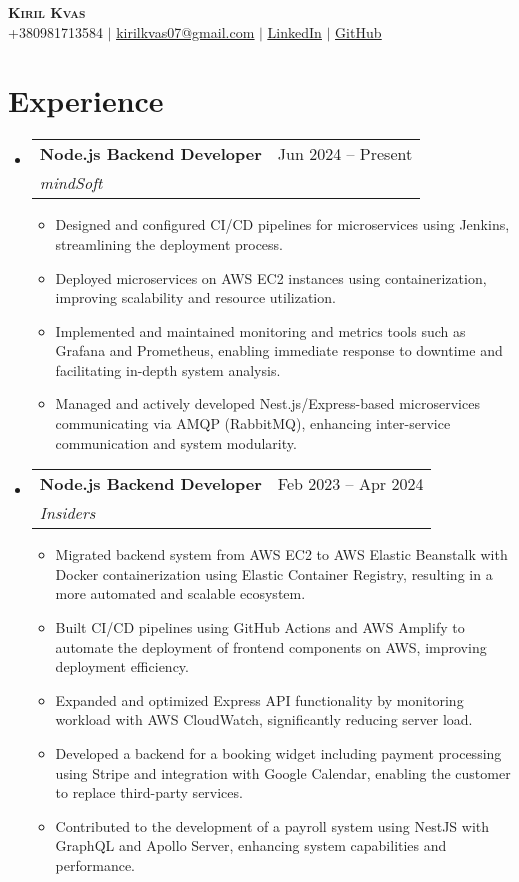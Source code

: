 \documentclass[letterpaper,11pt]{article}
\makeatletter
\newcommand{\resumeItem}[1]{
  \item\small{
    {#1 \vspace{-2pt}}
  }
}
\newcommand{\resumeSubheading}[4]{
  \vspace{-2pt}\item
    \begin{tabular*}{0.97\textwidth}[t]{l@{\extracolsep{\fill}}r}
      \textbf{#1} & #2 \\
      \textit{\small#3} & \textit{\small #4} \\
    \end{tabular*}\vspace{-7pt}
}
\newcommand{\resumeSubHeadingListStart}{\begin{itemize}[leftmargin=0.15in, label={}]}
\newcommand{\resumeSubHeadingListEnd}{\end{itemize}}
\newcommand{\resumeItemListStart}{\begin{itemize}}
\newcommand{\resumeItemListEnd}{\end{itemize}\vspace{-5pt}}
\makeatother
\begin{document}
\begin{center}
    \textbf{\Huge \scshape Kiril Kvas} \\ \vspace{1pt}
    \small +380981713584 $|$ \href{mailto:kirilkvas07@gmail.com}{\underline{kirilkvas07@gmail.com}} $|$ 
    \href{https://www.linkedin.com/in/kiril-kvas-999154239/}{\underline{LinkedIn}} $|$
    \href{https://github.com/rillsvai}{\underline{GitHub}}
\end{center}

\section{Experience}
\resumeSubHeadingListStart
    \resumeSubheading
      {Node.js Backend Developer}{Jun 2024 -- Present}
      {mindSoft}{}
      \resumeItemListStart
        \resumeItem{Designed and configured CI/CD pipelines for microservices using Jenkins, streamlining the deployment process.}
        \resumeItem{Deployed microservices on AWS EC2 instances using containerization, improving scalability and resource utilization.}
        \resumeItem{Implemented and maintained monitoring and metrics tools such as Grafana and Prometheus, enabling immediate response to downtime and facilitating in-depth system analysis.}
        \resumeItem{Managed and actively developed Nest.js/Express-based microservices communicating via AMQP (RabbitMQ), enhancing inter-service communication and system modularity.}
      \resumeItemListEnd
\resumeSubHeadingListEnd

\resumeSubHeadingListStart
    \resumeSubheading
      {Node.js Backend Developer}{Feb 2023 -- Apr 2024}
      {Insiders}{}
      \resumeItemListStart
            \resumeItem{Migrated backend system from AWS EC2 to AWS Elastic Beanstalk with Docker containerization using Elastic Container Registry, resulting in a more automated and scalable ecosystem.}
            \resumeItem{Built CI/CD pipelines using GitHub Actions and AWS Amplify to automate the deployment of frontend components on AWS, improving deployment efficiency.}
            \resumeItem{Expanded and optimized Express API functionality by monitoring workload with AWS CloudWatch, significantly reducing server load.}
            \resumeItem{Developed a backend for a booking widget including payment processing using Stripe and integration with Google Calendar, enabling the customer to replace third-party services.}
            \resumeItem{Contributed to the development of a payroll system using NestJS with GraphQL and Apollo Server, enhancing system capabilities and performance.}
      \resumeItemListEnd
\resumeSubHeadingListEnd
\end{document}
